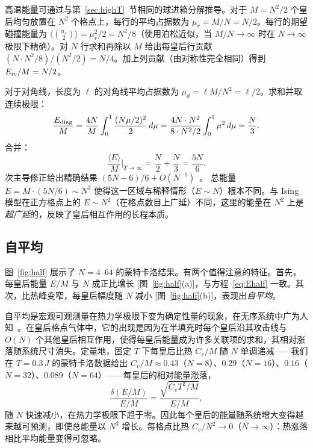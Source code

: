 \documentclass[aps, pre, reprint, amsmath, amssymb, superscriptaddress, floatfix]{revtex4-2}
\begin{document}
高温能量可通过与第~\ref{sec:highT}~节相同的球进箱分解推导。对于 $M = N^2/2$ 个皇后均匀放置在 $N^2$ 个格点上，每行的平均占据数为 $\mu_r = M/N = N/2$。每行的期望碰撞能量为 $\langle\binom{n_r}{2}\rangle = \mu_r^2/2 = N^2/8$（使用泊松近似，当 $M/N \to \infty$ 时在 $N \to \infty$ 极限下精确）。对 $N$ 行求和再除以 $M$ 给出每皇后行贡献 $(N \cdot N^2/8)/(N^2/2) = N/4$。加上列贡献（由对称性完全相同）得到 $E_{\rm rc}/M = N/2$。

对于对角线，长度为 $\ell$ 的对角线平均占据数为 $\mu_d = \ell M/N^2 = \ell/2$。求和并取连续极限：
\begin{equation}
  \frac{E_{\rm diag}}{M}
  = \frac{4N}{M}\int_0^1 \frac{(N\mu/2)^2}{2}\,d\mu
  = \frac{4N \cdot N^2}{8 \cdot N^2/2}\int_0^1 \mu^2\,d\mu
  = \frac{N}{3}.
  \label{eq:E_half_diag}
\end{equation}
合并：
\begin{equation}
  \frac{\langle E\rangle}{M}\bigg|_{T \to \infty}
  = \frac{N}{2} + \frac{N}{3} = \frac{5N}{6}.
  \label{eq:Ehalf}
\end{equation}
次主导修正给出精确结果 $(5N - 6)/6 + O(N^{-1})$~\cite{Polson2024}。
总能量 $E = M \cdot (5N/6) \sim N^3$ 使得这一区域与稀释情形（$E \sim N$）根本不同。与 Ising 模型在正方格点上的 $E \sim N^2$（在格点数目上广延）不同，这里的能量在 $N^2$ 上是\emph{超广延}的，反映了皇后相互作用的长程本质。

\subsection{自平均}

图~\ref{fig:half} 展示了 $N = 4$--$64$ 的蒙特卡洛结果。有两个值得注意的特征。首先，每皇后能量 $E/M$ 与 $N$ 成正比增长 [图~\ref{fig:half}(a)]，与方程~\eqref{eq:Ehalf} 一致。其次，比热峰变窄，每皇后幅度随 $N$ 减小 [图~\ref{fig:half}(b)]，表现出\textit{自平均}。

自平均是宏观可观测量在热力学极限下变为确定性量的现象，在无序系统中广为人知~\cite{Mezard1987}。在皇后格点气体中，它的出现是因为在半填充时每个皇后沿其攻击线与 $O(N)$ 个其他皇后相互作用，使得每皇后能量成为许多关联项的求和，其相对涨落随系统尺寸消失。定量地，固定 $T$ 下每皇后比热 $C_v/M$ 随 $N$ 单调递减——我们在 $T = 0.3\,J$ 的蒙特卡洛数据给出 $C_v/M \approx 0.43$（$N = 8$）、$0.29$（$N = 16$）、$0.16$（$N = 32$）、$0.089$（$N = 64$）——每皇后的相对能量涨落，
\begin{equation}
  \frac{\delta(E/M)}{E/M}
  = \frac{\sqrt{C_v T^2/M}}{E/M},
  \label{eq:self_avg}
\end{equation}
随 $N$ 快速减小，在热力学极限下趋于零。因此每个皇后的能量随系统增大变得越来越可预测，即使总能量以 $N^3$ 增长。每格点比热 $C_v/N^2 \to 0$（$N \to \infty$）：热涨落相比平均能量变得可忽略。
\end{document}
